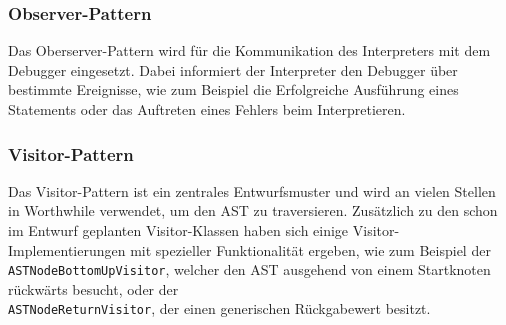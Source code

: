 \subsubsection{Observer-Pattern}
Das Oberserver-Pattern wird für die Kommunikation des Interpreters mit dem Debugger eingesetzt. Dabei informiert der Interpreter den Debugger über bestimmte Ereignisse, wie zum Beispiel die Erfolgreiche Ausführung eines Statements oder das Auftreten eines Fehlers beim Interpretieren.

\subsubsection{Visitor-Pattern}
Das Visitor-Pattern ist ein zentrales Entwurfsmuster und wird an vielen Stellen in Worthwhile verwendet, um den AST zu traversieren. Zusätzlich zu den schon im Entwurf geplanten Visitor-Klassen haben sich einige Visitor-Implementierungen mit spezieller Funktionalität ergeben, wie zum Beispiel der \texttt{ASTNodeBottomUpVisitor}, welcher den AST ausgehend von einem Startknoten rückwärts besucht, oder der \\ \texttt{ASTNodeReturnVisitor}, der einen generischen Rückgabewert besitzt.
